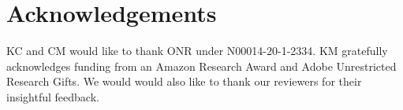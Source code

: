 
\section*{Acknowledgements} 
KC and CM would like to thank ONR under N00014-20-1-2334. KM gratefully acknowledges funding from an Amazon Research Award and Adobe Unrestricted Research Gifts. We would would also like to thank our reviewers for their insightful feedback.
%

